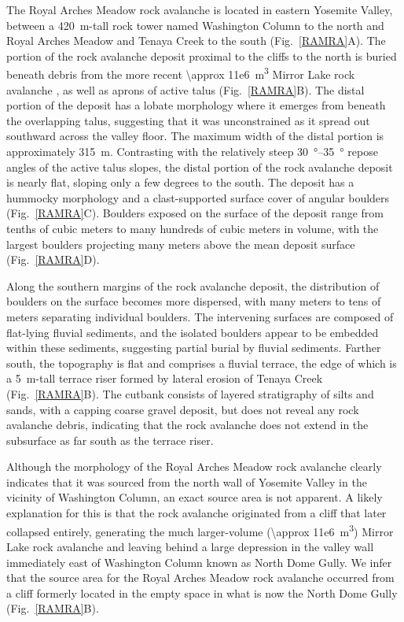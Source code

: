\documentclass[utf8]{frontiersSCNS}
\begin{document}
The Royal Arches Meadow rock avalanche is located in eastern Yosemite Valley, between a \SI{420}{m}-tall rock tower named Washington Column to the north and Royal Arches Meadow and Tenaya Creek to the south (Fig.~\ref{RAMRA}A).  The portion of the rock avalanche deposit proximal to the cliffs to the north is buried beneath debris from the more recent \SI{\approx 11e6}{m^3} Mirror Lake rock avalanche \citep[][]{wieczorek1999rock, wieczorek2002catastrophic}, as well as aprons of active talus (Fig.~\ref{RAMRA}B).  The distal portion of the deposit has a lobate morphology where it emerges from beneath the overlapping talus, suggesting that it was unconstrained as it spread out southward across the valley floor.  The maximum width of the distal portion is approximately \SI{315}{m}. Contrasting with the relatively steep \SIrange{30}{35}{\degree} repose angles of the active talus slopes, the distal portion of the rock avalanche deposit is nearly flat, sloping only a few degrees to the south.  The deposit has a hummocky morphology and a clast-supported surface cover of angular boulders (Fig.~\ref{RAMRA}C).  Boulders exposed on the surface of the deposit range from tenths of cubic meters to many hundreds of cubic meters in volume, with the largest boulders projecting many meters above the mean deposit surface (Fig.~\ref{RAMRA}D).

Along the southern margins of the rock avalanche deposit, the distribution of boulders on the surface becomes more dispersed, with many meters to tens of meters separating individual boulders.  The intervening surfaces are composed of flat-lying fluvial sediments, and the isolated boulders appear to be embedded within these sediments, suggesting partial burial by fluvial sediments. Farther south, the topography is flat and comprises a fluvial terrace, the edge of which is a \SI{5}{m}-tall terrace riser formed by lateral erosion of Tenaya Creek  (Fig.~\ref{RAMRA}B).  The cutbank consists of layered stratigraphy of silts and sands, with a capping coarse gravel deposit, but does not reveal any rock avalanche debris, indicating that the rock avalanche does not extend in the subsurface as far south as the terrace riser.

Although the morphology of the Royal Arches Meadow rock avalanche clearly indicates that it was sourced from the north wall of Yosemite Valley in the vicinity of Washington Column, an exact source area is not apparent.  A likely explanation for this is that the rock avalanche originated from a cliff that later collapsed entirely, generating the much larger-volume (\SI{\approx 11e6}{m^3}) Mirror Lake rock avalanche \citep{wieczorek1999rock, wieczorek2002catastrophic} and leaving behind a large depression in the valley wall immediately east of Washington Column known as North Dome Gully.  We infer that the source area for the Royal Arches Meadow rock avalanche occurred from a cliff formerly located in the empty space in what is now the North Dome Gully (Fig.~\ref{RAMRA}B).
\end{document}
